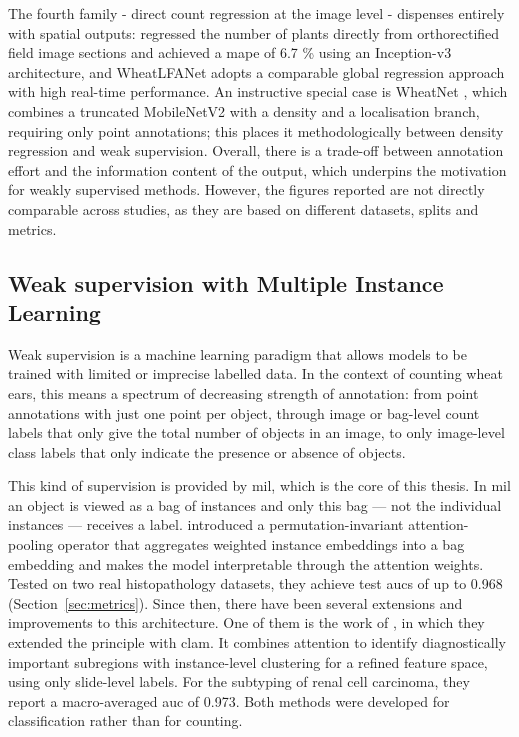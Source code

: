 \documentclass[12pt,parskip = half, DIV=classic,listof=totoc]{scrartcl}
\begin{document}
		 	The fourth family - direct count regression at the image level - dispenses entirely with spatial outputs: \textcite{riberaCountingPlantsUsing2017} regressed the number 
			of plants directly from orthorectified field image sections and achieved a \ac{mape} of 6.7 \% using an Inception-v3 architecture, 
			and WheatLFANet \cite{yeWheatLFANetInfieldDetection2023} adopts a comparable global regression approach with high real-time performance. An instructive special case is WheatNet \cite{khakiHighthroughputImagebasedPlant2022}, 
			which combines a truncated MobileNetV2 with a density and a localisation branch, requiring only point annotations; 
			this places it methodologically between density regression and weak supervision. Overall, there is a trade-off between annotation effort and the information content of the output, 
			which underpins the motivation for weakly supervised methods. However, the figures reported are not directly comparable across studies, as they are based on different datasets, 
			splits and metrics.

		\subsection{Weak supervision with Multiple Instance Learning}
			Weak supervision is a machine learning paradigm that allows models to be trained with limited or imprecise labelled data. In the context of counting wheat ears,
			this means a spectrum of decreasing strength of annotation: from point annotations with just one point per object, through image or bag-level count labels that only
			give the total number of objects in an image, to only image-level class labels that only indicate the presence or absence of objects.

			This kind of supervision is provided by \ac{mil}, which is the core of this thesis. In \ac{mil} an object is viewed as a
			bag of instances and only this bag --- not the individual instances --- receives a label. \textcite{ilseAttentionbasedDeepMultiple2018} introduced a permutation-invariant attention-
			pooling operator that aggregates weighted instance embeddings into a bag embedding and makes the model interpretable through the attention
			weights. Tested on two real histopathology datasets, they achieve test \acp{auc} of up to 0.968 (Section~\ref{sec:metrics}). Since then, there have been several extensions and improvements to this architecture.
			One of them is the work of \textcite{luDataEfficientWeakly2020}, in which they extended the principle with \ac{clam}. It combines attention to identify diagnostically
			important subregions with instance-level clustering for a refined feature space, using only slide-level labels. For the subtyping of renal cell carcinoma, 
			they report a macro-averaged \ac{auc} of 0.973. Both methods were developed for classification rather than for counting.
\end{document}
